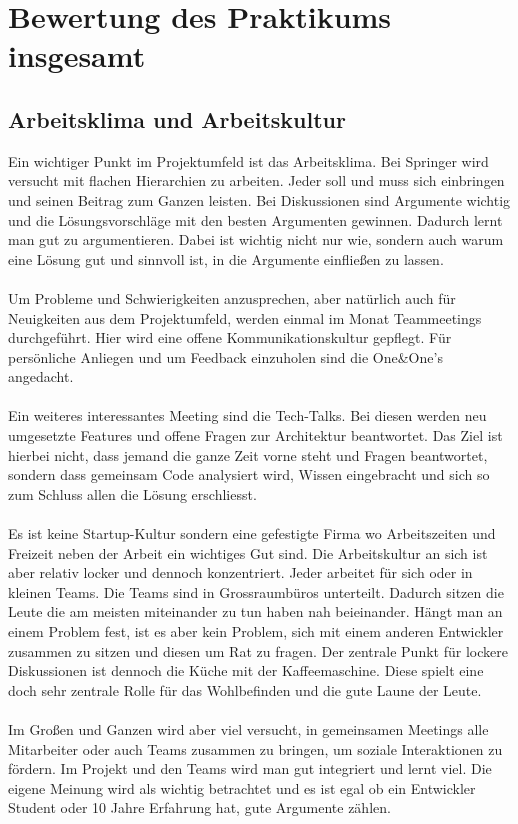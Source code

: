 \section{Bewertung des Praktikums insgesamt}
\label{sec:Fazit:BP}

\subsection{Arbeitsklima und Arbeitskultur}
\label{sec:Fazit:BP:AA}

Ein wichtiger Punkt im Projektumfeld ist das Arbeitsklima. Bei Springer wird versucht mit flachen Hierarchien zu arbeiten. Jeder soll und muss sich einbringen und seinen Beitrag zum Ganzen leisten. Bei Diskussionen sind Argumente wichtig und die Lösungsvorschläge mit den besten Argumenten gewinnen. Dadurch lernt man gut zu argumentieren. Dabei ist wichtig nicht nur wie, sondern auch warum eine Lösung gut und sinnvoll ist, in die Argumente einfließen zu lassen. 
\\
\\
Um Probleme und Schwierigkeiten anzusprechen, aber natürlich auch für Neuigkeiten aus dem Projektumfeld, werden einmal im Monat Teammeetings durchgeführt. Hier wird eine offene Kommunikationskultur gepflegt. Für persönliche Anliegen und um Feedback einzuholen sind die One{\&}One's angedacht.
\\
\\
Ein weiteres interessantes Meeting sind die Tech-Talks. Bei diesen werden neu umgesetzte Features und offene Fragen zur Architektur beantwortet. Das Ziel ist hierbei nicht, dass jemand die ganze Zeit vorne steht und Fragen beantwortet, sondern dass gemeinsam Code analysiert wird, Wissen eingebracht und sich so zum Schluss allen die Lösung erschliesst.
\\
\\
Es ist keine Startup-Kultur sondern eine gefestigte Firma wo Arbeitszeiten und Freizeit neben der Arbeit ein wichtiges Gut sind. Die Arbeitskultur an sich ist aber relativ locker und dennoch konzentriert. Jeder arbeitet für sich oder in kleinen Teams. Die Teams sind in Grossraumbüros unterteilt. Dadurch sitzen die Leute die am meisten miteinander zu tun haben nah beieinander. Hängt man an einem Problem fest, ist es aber kein Problem, sich mit einem anderen Entwickler zusammen zu sitzen und diesen um Rat zu fragen. Der zentrale Punkt für lockere Diskussionen ist dennoch die Küche mit der Kaffeemaschine. Diese spielt eine doch sehr zentrale Rolle für das Wohlbefinden und die gute Laune der Leute. 
\\
\\
Im Großen und Ganzen wird aber viel versucht, in gemeinsamen Meetings alle Mitarbeiter oder auch Teams zusammen zu bringen, um soziale Interaktionen zu fördern. Im Projekt und den Teams wird man gut integriert und lernt viel. Die eigene Meinung wird als wichtig betrachtet und es ist egal ob ein Entwickler Student oder 10 Jahre Erfahrung hat, gute Argumente zählen.

